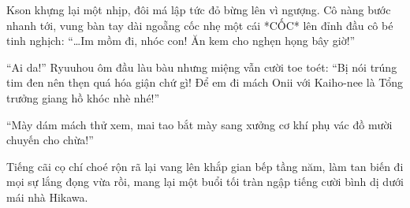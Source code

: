 \documentclass[../main.tex]{subfiles}
\begin{document}
Kson khựng lại một nhịp, đôi má lập tức đỏ bừng lên vì ngượng. Cô nàng bước nhanh tới, vung bàn tay dài ngoẵng cốc nhẹ một cái *CỐC* lên đỉnh đầu cô bé tinh nghịch: ``\dots Im mồm đi, nhóc con! Ăn kem cho nghẹn họng bây giờ!''

``Ai da!'' Ryuuhou ôm đầu làu bàu nhưng miệng vẫn cười toe toét: ``Bị nói trúng tim đen nên thẹn quá hóa giận chứ gì! Để em đi mách Onii với Kaiho-nee là Tổng trưởng giang hồ khóc nhè nhé!''

``Mày dám mách thử xem, mai tao bắt mày sang xưởng cơ khí phụ vác đồ mười chuyến cho chừa!''

Tiếng cãi cọ chí choé rộn rã lại vang lên khắp gian bếp tầng năm, làm tan biến đi mọi sự lắng đọng vừa rồi, mang lại một buổi tối tràn ngập tiếng cười bình dị dưới mái nhà Hikawa.
\end{document}
